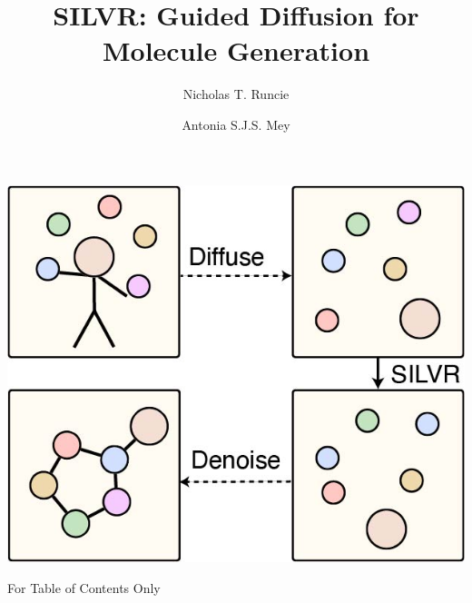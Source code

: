 \documentclass[journal=jacsat,manuscript=article]{achemso}
\author{Nicholas T. Runcie}
\author{Antonia S.J.S. Mey}
\title[SILVR: Molecular Generation for binding modes]
  {SILVR: Guided Diffusion for Molecule Generation}
\begin{document}
\begin{tocentry}
\centering
    \includegraphics{paper/Figures/TOC/TOC_stickman_to_mol.jpg}
    \caption{For Table of Contents Only}
    \label{fig:toc}
\end{tocentry}
\end{document}
